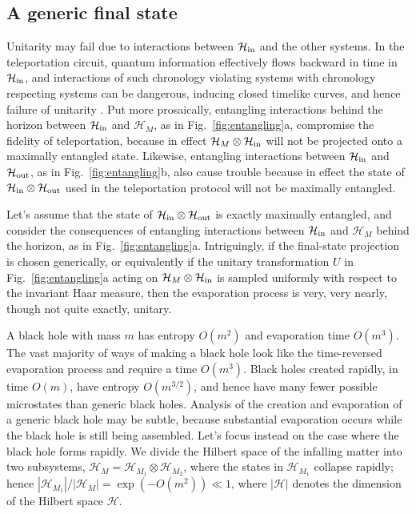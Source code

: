 \documentclass[11pt]{article}
\begin{document}
\subsection{A generic final state}
\label{subsec:generic}
Unitarity may fail due to interactions between $\mathcal{H}_{\rm in}$ and the other systems. In the teleportation circuit, quantum information effectively flows backward in time in $\mathcal{H}_{\rm in}$, and interactions of such chronology violating systems with chronology respecting systems can be dangerous, inducing closed timelike curves, and hence failure of unitarity \cite{lloyd-ctc1,lloyd-ctc2}. Put more prosaically, entangling interactions behind the horizon between $\mathcal{H}_{\rm in}$ and $\mathcal{H}_M$, as in Fig.~\ref{fig:entangling}a, compromise the fidelity of teleportation, because in effect $\mathcal{H}_M\otimes\mathcal{H}_{\rm in}$ will not be projected onto a maximally entangled state. Likewise, entangling interactions between $\mathcal{H}_{\rm in}$ and $\mathcal{H}_{\rm out}$, as in Fig.~\ref{fig:entangling}b, also cause trouble because in effect the state of $\mathcal{H}_{\rm in}\otimes\mathcal{H}_{\rm out}$ used in the teleportation protocol will not be maximally entangled. 

Let's assume that the state of $\mathcal{H}_{\rm in}\otimes \mathcal{H}_{\rm out}$ is exactly maximally entangled, and consider the consequences of entangling interactions between $\mathcal{H}_{\rm in}$ and $\mathcal{H}_M$ behind the horizon, as in Fig.~\ref{fig:entangling}a. Intriguingly, if the final-state projection is chosen generically, or equivalently if the unitary transformation $U$ in Fig.~\ref{fig:entangling}a acting on $\mathcal{H}_M\otimes\mathcal{H}_{\rm in}$ is sampled uniformly with respect to the invariant Haar measure, then the evaporation process is very, very nearly, though not quite exactly, unitary.

A black hole with mass $m$ has entropy $O(m^2)$ and evaporation time $O(m^3)$. The vast majority of ways of making a black hole look like the time-reversed evaporation process and require a time $O(m^3)$. Black holes created rapidly, in time $O(m)$, have entropy $O(m^{3/2})$, and hence have many fewer possible microstates than generic black holes. Analysis of the creation and evaporation of a generic black hole may be subtle, because substantial evaporation occurs while the black hole is still being assembled. Let's focus instead on the case where the black hole forms rapidly. We divide the Hilbert space of the infalling matter into two subsystems, $\mathcal{H}_M=\mathcal{H}_{M_1}\otimes \mathcal{H}_{M_2}$, where the states in $\mathcal{H}_{M_1}$ collapse rapidly; hence $|\mathcal{H}_{M_1}|/|\mathcal{H}_{M}|= \exp\left(-O(m^2)\right)\ll 1$, where $|
\mathcal{H}|$ denotes the dimension of the Hilbert space $\mathcal{H}$.
\end{document}
